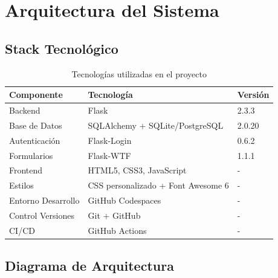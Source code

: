 \documentclass[12pt,a4paper]{article}
\begin{document}
\section{Arquitectura del Sistema}

\subsection{Stack Tecnológico}

\begin{table}[H]
\centering
\caption{Tecnologías utilizadas en el proyecto}
\begin{tabular}{|l|l|l|}
\hline
\textbf{Componente} & \textbf{Tecnología} & \textbf{Versión} \\
\hline
Backend & Flask & 2.3.3 \\
Base de Datos & SQLAlchemy + SQLite/PostgreSQL & 2.0.20 \\
Autenticación & Flask-Login & 0.6.2 \\
Formularios & Flask-WTF & 1.1.1 \\
Frontend & HTML5, CSS3, JavaScript & - \\
Estilos & CSS personalizado + Font Awesome 6 & - \\
Entorno Desarrollo & GitHub Codespaces & - \\
Control Versiones & Git + GitHub & - \\
CI/CD & GitHub Actions & - \\
\hline
\end{tabular}
\end{table}

\subsection{Diagrama de Arquitectura}
\end{document}
